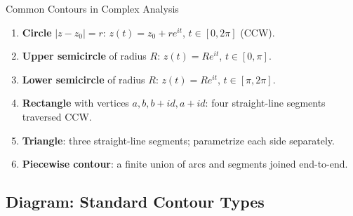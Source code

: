 \documentclass[12pt,a4paper]{article}
\begin{document}
\begin{infobox}{Common Contours in Complex Analysis}
\begin{enumerate}[leftmargin=1.5em]
\item \textbf{Circle} $|z - z_0| = r$: $z(t) = z_0 + re^{it}$, $t \in [0,2\pi]$ (CCW).
\item \textbf{Upper semicircle} of radius $R$: $z(t) = Re^{it}$, $t \in [0,\pi]$.
\item \textbf{Lower semicircle} of radius $R$: $z(t) = Re^{it}$, $t \in [\pi,2\pi]$.
\item \textbf{Rectangle} with vertices $a, b, b+id, a+id$: four straight-line
      segments traversed CCW.
\item \textbf{Triangle}: three straight-line segments; parametrize each side
      separately.
\item \textbf{Piecewise contour}: a finite union of arcs and segments joined end-to-end.
\end{enumerate}
\end{infobox}

\subsection*{Diagram: Standard Contour Types}
\end{document}
